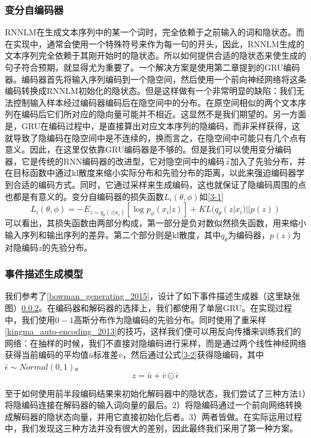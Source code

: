 \documentclass[]{template}
\begin{document}
\subsubsection{变分自编码器}
RNNLM在生成文本序列中的某一个词时，完全依赖于之前输入的词和隐状态。而在实现中，通常会使用一个特殊符号来作为每一句的开头，因此，RNNLM生成的文本序列完全依赖于其刚开始时的隐状态。所以如何提供合适的隐状态来使生成的句子符合预期，就显得尤为重要了。一个解决方案是使用第二章提到的GRU编码器。编码器首先将输入序列编码到一个隐空间，然后使用一个前向神经网络将这条编码转换成RNNLM初始化的隐状态。但是这样做有一个非常明显的缺陷：我们无法控制输入样本经过编码器编码后在隐空间中的分布。在原空间相似的两个文本序列在编码后它们所对应的隐向量可能并不相近。这显然不是我们期望的。另一方面是，GRU在编码过程中，是直接算出对应文本序列的隐编码，而非采样获得，这就导致了隐编码在隐空间中是不连续的，换而言之，在隐空间中可能只有几个点有意义。因此，在这里仅依靠GRU编码器是不够的。但是我们可以使用变分编码器，它是传统的RNN编码器的改进型，它对隐空间中的编码\(\overrightarrow{z}\)加入了先验分布，并在目标函数中通过kl散度来缩小实际分布和先验分布的距离，以此来强迫编码器学到合适的编码方式。同时，它通过采样来生成编码，这也就保证了隐编码周围的点也都是有意义的。变分自编码器的损失函数$L_i(\theta,\phi)$如\ref{3-1}
\begin{equation}\label{3-1}
    L_i(\theta,\phi)=-E_{z\sim q_\theta(z|x_i)}[\log p_\phi(x_i|z)]+KL (q_\theta(z|x_i)||p(z))
\end{equation}
可以看出，其损失函数由两部分构成，第一部分是负对数似然损失函数，用来缩小输入序列和输出序列的差异。第二个部分则是kl散度，其中$q_\theta$为编码器，$p(z)$为对隐编码$z$的先验分布。

\subsubsection{事件描述生成模型}
我们参考了\ref{bowman_generating_2015}，设计了如下事件描述生成器（这里缺张图）\ref{}。在编码器和解码器的选择上，我们都使用了单层GRU。在实现过程中，我们使用$0-1$高斯分布作为隐编码的先验分布。同时使用了重采样\ref{kingma_auto-encoding_2013}的技巧，这样我们便可以用反向传播来训练我们的网络：在抽样的时候，我们不直接对隐编码进行采样，而是通过两个线性神经网络获得当前编码的平均值$\bar{u}$标准差$\bar{v}$，然后通过公式\ref{3-2}获得隐编码，其中$\bar\epsilon \sim Normal(0,1)$。
\begin{equation}\label{3-2}
    z=\bar{u}+\bar{v}\odot \bar\epsilon
\end{equation}

至于如何使用前半段编码结果来初始化解码器中的隐状态，我们尝试了三种方法1）将隐编码连接在解码器的输入词向量的最后。2）将隐编码通过一个前向网络转换成解码器的隐状态向量，并用它直接初始化后者。3）两者皆做。在实际运用过程中，我们发现这三种方法并没有很大的差别，因此最终我们采用了第一种方案。
\end{document}
